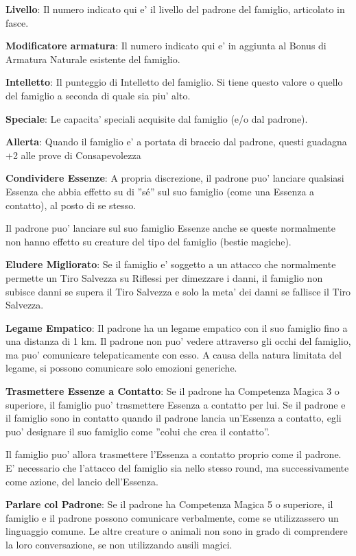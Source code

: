 \documentclass[a4paper,11pt,twoside,openany]{book}
\begin{document}
\textbf{Livello}: Il numero indicato qui e' il livello del padrone del famiglio, articolato in fasce.

\textbf{Modificatore armatura}: Il numero indicato qui e' in aggiunta al Bonus di Armatura Naturale esistente del famiglio.

\textbf{Intelletto}: Il punteggio di Intelletto del famiglio. Si tiene questo valore o quello del famiglio a seconda di quale sia piu' alto. 

\textbf{Speciale}: Le capacita' speciali acquisite dal famiglio (e/o dal padrone).

\textbf{Allerta}: Quando il famiglio e' a portata di braccio dal padrone, questi guadagna +2 alle prove di Consapevolezza

\textbf{Condividere Essenze}: A propria discrezione, il padrone puo' lanciare qualsiasi Essenza che abbia effetto su di ''sé'' sul suo famiglio (come una Essenza a contatto), al posto di se stesso.

Il padrone puo' lanciare sul suo famiglio Essenze anche se queste normalmente non hanno effetto su creature del tipo del famiglio (bestie magiche).

\textbf{Eludere Migliorato}: Se il famiglio e' soggetto a un attacco che normalmente permette un Tiro Salvezza su Riflessi per dimezzare i danni, il famiglio non subisce danni se supera il Tiro Salvezza e solo la meta' dei danni se fallisce il Tiro Salvezza.

\textbf{Legame Empatico}: Il padrone ha un legame empatico con il suo famiglio fino a una distanza di 1 km. Il padrone non puo' vedere attraverso gli occhi del famiglio, ma puo' comunicare telepaticamente con esso. A causa della natura limitata del legame, si possono comunicare solo emozioni generiche.

\textbf{Trasmettere Essenze a Contatto}: Se il padrone ha Competenza Magica 3 o superiore, il famiglio puo' trasmettere Essenza a contatto per lui. Se il padrone e il famiglio sono in contatto quando il padrone lancia un'Essenza a contatto, egli puo' designare il suo famiglio come ''colui che crea il contatto''.

Il famiglio puo' allora trasmettere l'Essenza a contatto proprio come il padrone. E' necessario che l'attacco del famiglio sia nello stesso round, ma successivamente come azione, del lancio dell'Essenza.

\textbf{Parlare col Padrone}: Se il padrone ha Competenza Magica 5 o superiore, il famiglio e il padrone possono comunicare verbalmente, come se utilizzassero un linguaggio comune. Le altre creature o animali non sono in grado di comprendere la loro conversazione, se non utilizzando ausili magici.
\end{document}
